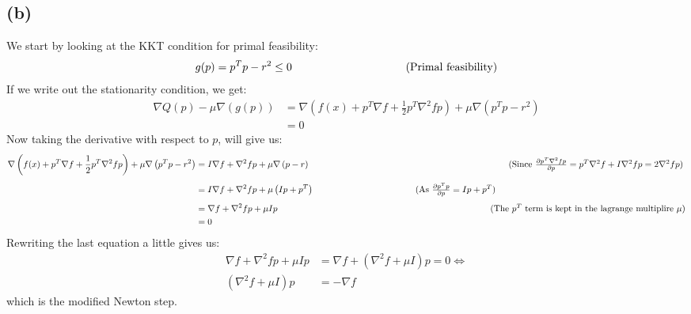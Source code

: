 \documentclass[a4paper, fleqn]{article}
\newcommand{\comment}[1]{%
  \text{\phantom{(#1)}} \tag{#1}}
\begin{document}
\subsection{(b)}
We start by looking at the KKT condition for primal feasibility:
\begin{align*}
  g(p)&=p^Tp-r^2\leq 0 \comment{Primal feasibility} \\
\end{align*}
If we write out the stationarity condition, we get:
\begin{align*}
  \nabla Q(p)-\mu\nabla \left(g(p)\right) &= \nabla\left(f(x)+p^T\nabla f +
\frac{1}{2}p^T\nabla^2 fp \right)+\mu\nabla \left(p^Tp-r^2\right) \\
&= 0
\end{align*}
Now taking the derivative with respect to $p$, will give us:
\begin{align*}
  \nabla\left(f(x)+p^T\nabla f + \frac{1}{2}p^T\nabla^2 fp \right)+\mu\nabla
  \left(p^Tp-r^2\right) &= I\nabla f + \nabla^2 fp+\mu\nabla \left(p-r\right)
  \comment{Since
$\frac{\partial p^T\nabla^2fp}{\partial p}=p^T\nabla^2 f+I\nabla^2 fp=2\nabla^2 fp$} \\
&=I\nabla f + \nabla^2 fp+\mu \left(Ip+p^T\right) \comment{As $\frac{\partial
p^Tp}{\partial p}=Ip+p^T$} \\
&=\nabla f + \nabla^2 fp+\mu Ip \comment{The $p^T$ term is kept in the lagrange
multiplire $\mu$} \\
&= 0
\end{align*}
Rewriting the last equation a little gives us:
\begin{align*}
  \nabla f + \nabla^2 fp+\mu Ip &= \nabla f + \left(\nabla^2 f+ \mu I\right)p = 0
  \Leftrightarrow \\
  \left(\nabla^2 f + \mu I\right)p&=-\nabla f
\end{align*}
which is the modified Newton step.
\end{document}

